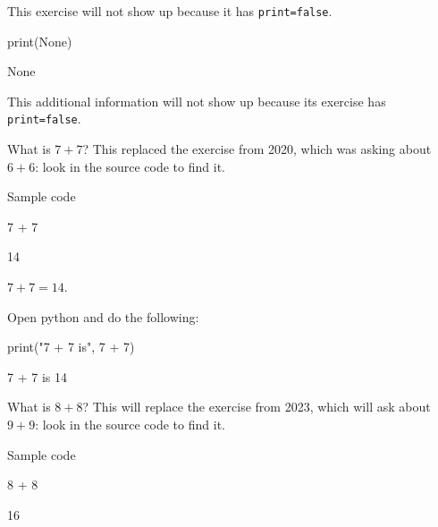 \documentclass{book}
\begin{document}
\begin{exercise}[print=false]
This exercise will not show up because it has \texttt{print=false}.
\end{exercise}

\begin{solution}
\begin{pycell}
print(None)
\end{pycell}
\begin{pyexpectedoutput}
None
\end{pyexpectedoutput}
\end{solution}

\begin{additionalinformation}
This additional information will not show up because its exercise has \texttt{print=false}.
\end{additionalinformation}

\begin{exercise}[examdate={January 16, 2021}, examproblemnumber={1}, examproblemid={2021-01-16-01}]
  What is \(7 + 7\)? This replaced the exercise from 2020, which was asking about \(6 + 6\): look in the source code to find it.

Sample code
\begin{pycell}
7 + 7
\end{pycell}
\begin{pyexpectedoutput}
14
\end{pyexpectedoutput}
\end{exercise}

\begin{solution}
  \(7 + 7 = 14\).
\end{solution}

\begin{additionalinformation}
Open python and do the following:

\begin{pycell}
print("7 + 7 is", 7 + 7)
\end{pycell}
\begin{pyexpectedoutput}
7 + 7 is 14
\end{pyexpectedoutput}
\end{additionalinformation}

\begin{exercise}[examdate={January 16, 2022}, examproblemnumber={1}, examproblemid={2022-01-16-01}]
  What is \(8 + 8\)? This will replace the exercise from 2023, which will ask about \(9 + 9\): look in the source code to find it.

Sample code
\begin{pycell}
8 + 8
\end{pycell}
\begin{pyexpectedoutput}
16
\end{pyexpectedoutput}
\end{exercise}
\end{document}
